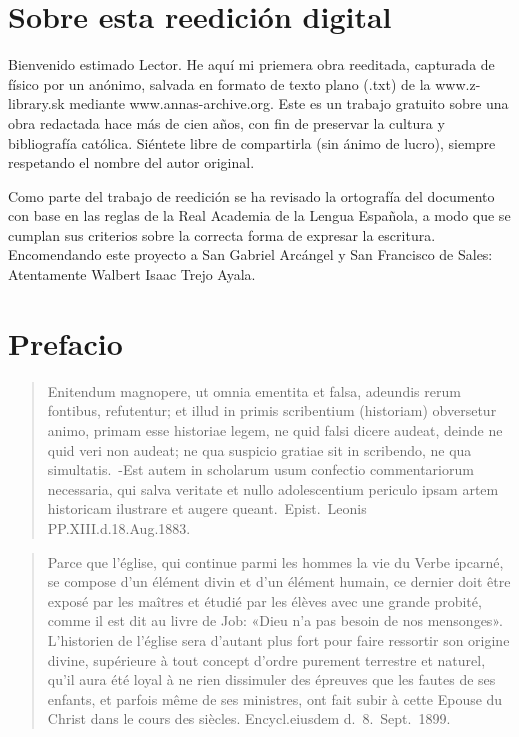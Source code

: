 \raggedbottom{} \documentclass[12pt]{book}
\begin{document}
\section{Sobre esta reedición digital}
Bienvenido estimado Lector. He aquí mi priemera obra reeditada, capturada de físico por un anónimo, salvada en formato de texto plano (.txt) de la www.z-library.sk mediante www.annas-archive.org\@. Este es un trabajo gratuito sobre una obra redactada hace más de cien años, con fin de preservar la cultura y bibliografía católica. Siéntete libre de compartirla (sin ánimo de lucro), siempre respetando el nombre del autor original.

Como parte del trabajo de reedición se ha revisado la ortografía del documento con base en las reglas de la Real Academia de la Lengua Española, a modo que se cumplan sus criterios sobre la correcta forma de expresar la escritura.
Encomendando este proyecto a San Gabriel Arcángel y San Francisco de Sales: Atentamente Walbert Isaac Trejo Ayala.
\section{Prefacio}
\begin{quotation}
  Enitendum magnopere, ut omnia ementita et falsa, adeundis rerum fontibus, refutentur; et illud in primis scribentium (historiam) obversetur animo, primam esse historiae legem, ne quid falsi dicere audeat, deinde ne quid veri non audeat; ne qua suspicio gratiae sit in scribendo, ne qua simultatis.\ -Est autem in scholarum usum confectio commentariorum necessaria, qui salva veritate et nullo adolescentium periculo ipsam artem historicam ilustrare et augere queant.\ Epist.\ Leonis PP.\@ XIII.\@ d.\@ 18.\@ Aug.\@ 1883.
\end{quotation}

\begin{quotation}
  Parce que l'église, qui continue parmi les hommes la vie du Verbe ipcarné, se compose d'un élément divin et d'un élément humain, ce dernier doit être exposé par les
  maîtres et étudié par les élèves avec une grande probité, comme il est dit au livre de
  Job: «Dieu n'a pas besoin de nos mensonges». L'historien de l'église sera d'autant plus
  fort pour faire ressortir son origine divine, supérieure à tout concept d'ordre purement
  terrestre et naturel, qu'il aura été loyal à ne rien dissimuler des épreuves que les fautes
  de ses enfants, et parfois même de ses ministres, ont fait subir à cette Epouse du Christ
  dans le cours des siècles.
  Encycl.\@ eiusdem d.\ 8.\ Sept.\ 1899.
\end{quotation}
\end{document}
